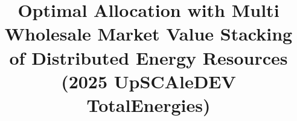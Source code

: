 \documentclass[conference]{IEEEtran}
\begin{document}
\title{Optimal Allocation with Multi Wholesale Market Value Stacking of Distributed Energy Resources \\
(2025 UpSCAleDEV TotalEnergies) \\}
\author{ \\
}


\maketitle
\thispagestyle{plain}
\pagestyle{plain}
\makenomenclature
\setlength{\nomitemsep}{-\parskip}
\renewcommand*\nompreamble{\begin{multicols}{2}}
\setlength{\parindent}{1em}
\renewcommand*\nompostamble{\end{multicols}}
\end{document}
